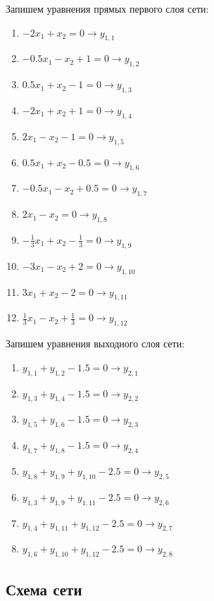 Запишем уравнения прямых первого слоя сети:
\begin{multicols}{2}
\begin{enumerate}
	\item $-2 x_1 + x_2 = 0 \rightarrow y_{1,1}$
	\item $-0.5 x_1 - x_2 + 1 = 0 \rightarrow y_{1,2}$
	\item $0.5 x_1 + x_2 - 1 = 0 \rightarrow y_{1,3}$
	\item $-2 x_1 + x_2 + 1 = 0 \rightarrow y_{1,4}$
	\item $2 x_1 - x_2 - 1 = 0 \rightarrow y_{1,5}$
	\item $0.5 x_1 + x_2 - 0.5 = 0 \rightarrow y_{1,6}$
	\item $-0.5 x_1 - x_2 + 0.5 = 0 \rightarrow y_{1,7}$
	\item $2 x_1 - x_2 = 0 \rightarrow y_{1,8}$
	\item $-\frac{1}{3} x_1 + x_2 - \frac{1}{3} = 0 \rightarrow y_{1,9}$
	\item $-3 x_1 - x_2 + 2 = 0 \rightarrow y_{1,10}$
	\item $3 x_1 + x_2 - 2 = 0 \rightarrow y_{1,11}$
	\item $\frac{1}{3} x_1 - x_2 + \frac{1}{3} = 0 \rightarrow y_{1,12}$
\end{enumerate}
\end{multicols}

Запишем уравнения выходного слоя сети:
\begin{multicols}{2}
\begin{enumerate}
	\item $y_{1,1} + y_{1,2} - 1.5 = 0 \rightarrow y_{2,1}$
	\item $y_{1,3} + y_{1,4} - 1.5 = 0 \rightarrow y_{2,2}$
	\item $y_{1,5} + y_{1,6} - 1.5 = 0 \rightarrow y_{2,3}$
	\item $y_{1,7} + y_{1,8} - 1.5 = 0 \rightarrow y_{2,4}$
	\item $y_{1,8} + y_{1,9} + y_{1,10} - 2.5 = 0 \rightarrow y_{2,5}$
	\item $y_{1,3} + y_{1,9} + y_{1,11} - 2.5 = 0 \rightarrow y_{2,6}$
	\item $y_{1,4} + y_{1,11} + y_{1,12} - 2.5 = 0 \rightarrow y_{2,7}$
	\item $y_{1,6} + y_{1,10} + y_{1,12} - 2.5 = 0 \rightarrow y_{2,8}$
\end{enumerate}
\end{multicols}

\subsection{Схема сети}

